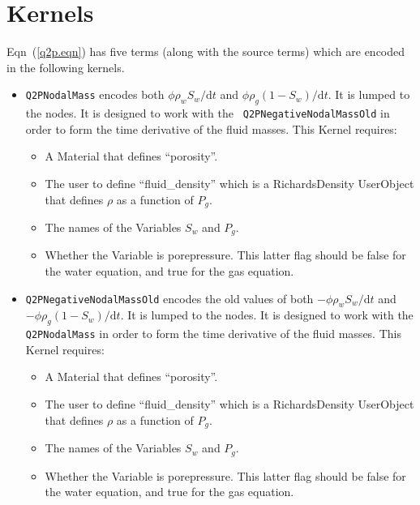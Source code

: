 \documentclass[]{scrreprt}
\begin{document}
\section{Kernels}

Eqn~(\ref{q2p.eqn}) has five terms (along with the source terms) which
are encoded in the following kernels.

\begin{itemize}

\item {\tt Q2PNodalMass} encodes both $\phi \rho_{w}
  S_{w}/{\mathrm{d}}t$ and $\phi \rho_{g} (1 - S_{w})/{\mathrm{d}}t$.
  It is lumped to the nodes.  It is designed to work with the {\tt
    Q2PNegativeNodalMassOld} in order to form the time derivative of
  the fluid masses.  This Kernel requires:
\begin{itemize}
\item A Material that defines ``porosity''.
\item The user to define ``fluid\_density'' which is a RichardsDensity
  UserObject that defines $\rho$ as a function of $P_{g}$.
\item The names of the Variables $S_{w}$ and $P_{g}$.
\item Whether the Variable is porepressure.  This latter flag should
  be false for the water equation, and true for the gas equation.
\end{itemize}

\item {\tt Q2PNegativeNodalMassOld} encodes the old values of both
  $-\phi \rho_{w} S_{w}/{\mathrm{d}}t$ and $-\phi \rho_{g} (1 -
  S_{w})/{\mathrm{d}}t$.  It is lumped to the nodes.  It is designed
  to work with the {\tt Q2PNodalMass} in order to form the
  time derivative of the fluid masses.  This Kernel requires:
\begin{itemize}
\item A Material that defines ``porosity''.
\item The user to define ``fluid\_density'' which is a RichardsDensity
  UserObject that defines $\rho$ as a function of $P_{g}$.
\item The names of the Variables $S_{w}$ and $P_{g}$.
\item Whether the Variable is porepressure.  This latter flag should
  be false for the water equation, and true for the gas equation.
\end{itemize}


\end{itemize}
\end{document}

